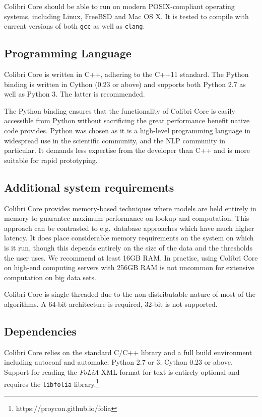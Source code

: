 \documentclass[a4paper,12pt]{article}
\begin{document}
Colibri Core should be able to run on modern POSIX-compliant operating systems, including
Linux, FreeBSD and Mac OS X. It is tested to compile with current versions of
both \texttt{gcc} as well as \texttt{clang}.

\subsection{Programming Language}

Colibri Core is written in C++, adhering to the C++11 standard. The Python
binding is written in Cython (0.23 or above) and supports both Python 2.7 as
well as Python 3. The latter is recommended.

The Python binding ensures that the functionality of Colibri Core is easily
accessible from Python without sacrificing the great performance benefit native
code provides. Python was chosen as it is a high-level programming language in
widespread use in the scientific community, and the NLP community in
particular. It demands less expertise from the developer than C++ and is more
suitable for rapid prototyping.

\subsection{Additional system requirements}

Colibri Core provides memory-based techniques where models are held entirely in
memory to guarantee maximum performance on lookup and computation.  This
approach can be contrasted to e.g.\ database approaches which have much higher
latency.  It does place considerable memory requirements on the system on which
is it run, though this depends entirely on the size of the data and the
thresholds the user uses. We recommend at least 16GB RAM. In practise, using Colibri
Core on high-end computing servers with 256GB RAM is not uncommon for extensive
computation on big data sets.

Colibri Core is single-threaded due to the non-distributable nature of most of the
algorithms. A 64-bit architecture is required, 32-bit is not supported.

\subsection{Dependencies}

Colibri Core relies on the standard C/C++ library and a full build environment including autoconf and
automake; Python 2.7 or 3; Cython 0.23 or above. Support for reading the
\emph{FoLiA} XML format for text is entirely optional and requires the \texttt{libfolia}
library.\footnote{https://proycon.github.io/folia}
\end{document}

